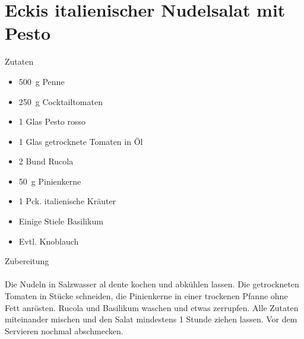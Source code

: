 
\section*{Eckis italienischer Nudelsalat mit Pesto}
\ihead{}\ohead{}
\cfoot{}
{\Large Zutaten}
\begin{multicols}{2}
\begin{itemize}
    \item \SI{500}{g} Penne
    \item \SI{250}{g} Cocktailtomaten
    \item \num{1} Glas Pesto rosso
    \item \num{1} Glas getrocknete Tomaten in Öl
    \item \num{2} Bund Rucola
    \item \SI{50}{g} Pinienkerne
    \item \num{1} Pck. italienische Kräuter
    \item Einige Stiele Basilikum
    \item Evtl. Knoblauch
\end{itemize}
\columnbreak
\end{multicols}
\noindent
{\Large Zubereitung}\\
\\
Die Nudeln in Salzwasser al dente kochen und abkühlen lassen.
Die getrockneten Tomaten in Stücke schneiden, die Pinienkerne in einer trockenen Pfanne ohne Fett anrösten. 
Rucola und Basilikum waschen und etwas zerrupfen.
Alle Zutaten miteinander mischen und den Salat mindestens 1 Stunde ziehen lassen. Vor dem Servieren nochmal abschmecken.

